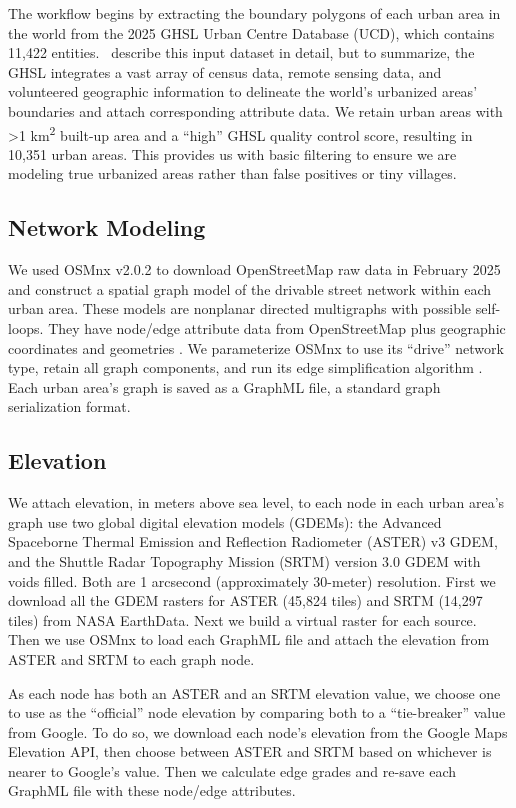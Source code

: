 \documentclass[12pt,letterpaper]{article} %
\begin{document}
The workflow begins by extracting the boundary polygons of each urban area in the world from the 2025 GHSL Urban Centre Database (UCD), which contains 11,422 entities.\ \citet{mari_rivero_urban_2025} describe this input dataset in detail, but to summarize, the GHSL integrates a vast array of census data, remote sensing data, and volunteered geographic information to delineate the world's urbanized areas' boundaries and attach corresponding attribute data. We retain urban areas with >1 km\textsuperscript{2} built-up area and a \enquote{high} GHSL quality control score, resulting in 10,351 urban areas. This provides us with basic filtering to ensure we are modeling true urbanized areas rather than false positives or tiny villages.

\subsection{Network Modeling}

We used OSMnx v2.0.2 to download OpenStreetMap raw data in February 2025 and construct a spatial graph model of the drivable street network within each urban area. These models are nonplanar directed multigraphs with possible self-loops. They have node/edge attribute data from OpenStreetMap plus geographic coordinates and geometries \citep{boeing_modeling_2025}. We parameterize OSMnx to use its \enquote{drive} network type, retain all graph components, and run its edge simplification algorithm \citep{boeing_topological_2025}. Each urban area's graph is saved as a GraphML file, a standard graph serialization format.

\subsection{Elevation}

We attach elevation, in meters above sea level, to each node in each urban area's graph use two global digital elevation models (GDEMs): the Advanced Spaceborne Thermal Emission and Reflection Radiometer (ASTER) v3 GDEM, and the Shuttle Radar Topography Mission (SRTM) version 3.0 GDEM with voids filled.
Both are 1 arcsecond (approximately 30-meter) resolution. First we download all the GDEM rasters for ASTER (45,824 tiles) and SRTM (14,297 tiles) from NASA EarthData. Next we build a virtual raster for each source. Then we use OSMnx to load each GraphML file and attach the elevation from ASTER and SRTM to each graph node.

As each node has both an ASTER and an SRTM elevation value, we choose one to use as the \enquote{official} node elevation by comparing both to a \enquote{tie-breaker} value from Google. To do so, we download each node's elevation from the Google Maps Elevation API, then choose between ASTER and SRTM based on whichever is nearer to Google's value. Then we calculate edge grades and re-save each GraphML file with these node/edge attributes.
\end{document}
